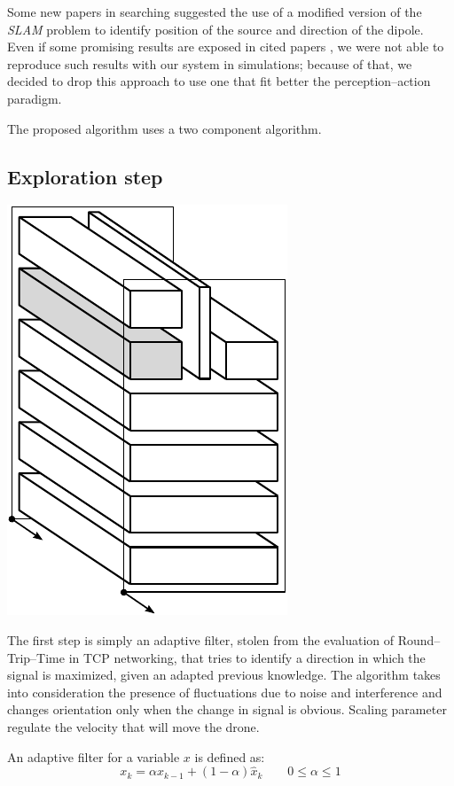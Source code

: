 Some new papers in searching suggested the use of a modified version of the \emph{SLAM} problem to identify position of the source and direction of the dipole. Even if some promising results are exposed in cited papers \citep{pinies2006fast,pinies2006localization}, we were not able to reproduce such results with our system in simulations; because of that, we decided to drop this approach to use one that fit better the perception--action paradigm.

The proposed algorithm uses a two component algorithm.

\subsection{Exploration step}
\begin{marginfigure}
	\centering
	\includegraphics[scale=0.5]{ch3/img/PA_map_direction.pdf}
\end{marginfigure}
The first step is simply an adaptive filter, stolen from the evaluation of Round--Trip--Time in TCP networking, that tries to identify a direction in which the signal is maximized, given an adapted previous knowledge. The algorithm takes into consideration the presence of fluctuations due to noise and interference and changes orientation only when the change in signal is obvious. Scaling parameter regulate the velocity that will move the drone.

An adaptive filter for a variable $x$ is defined as:
\[
x_k = \alpha x_{k-1} + (1-\alpha) \hat{x}_k \qquad 0 \leq \alpha \leq 1
\]

